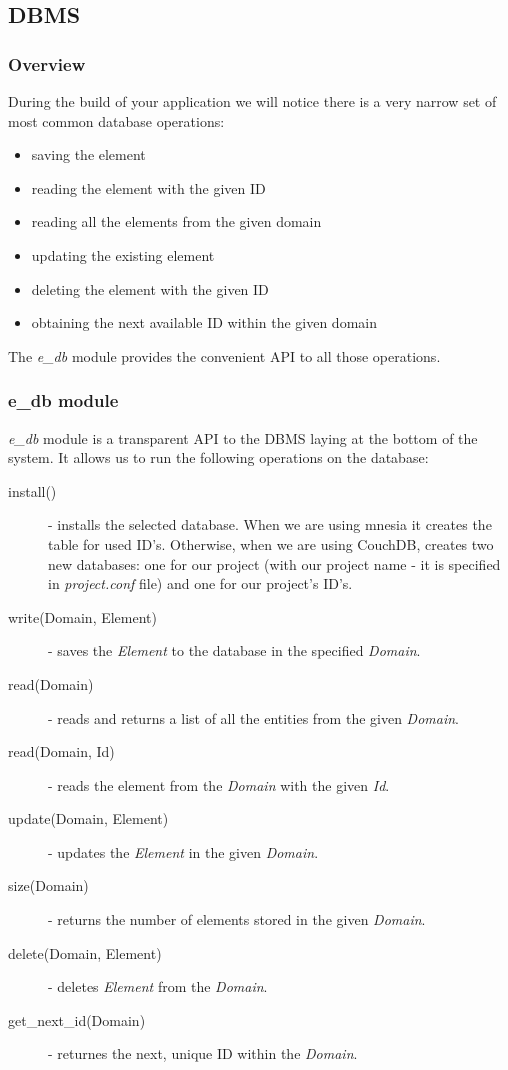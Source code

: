\subsection{DBMS}
\subsubsection{Overview}
During the build of your application we will notice there is a very narrow set of most common database operations:
\begin{itemize}
\item saving the element
\item reading the element with the given ID
\item reading all the elements from the given domain
\item updating the existing element
\item deleting the element with the given ID
\item obtaining the next available ID within the given domain
\end{itemize}

The {\it e\_db} module provides the convenient API to all those operations.

\subsubsection{e\_db module}
{\it e\_db} module is a transparent API to the DBMS laying at the bottom of the system. It allows us to run the following operations on the database:
\begin{description}
\item[install()]- installs the selected database. When we are using mnesia it creates the table for used ID's. Otherwise, when we are using CouchDB, creates two new databases: one for our project (with our project name - it is specified in {\it project.conf} file) and one for our project's ID's.
\item[write(Domain, Element)]- saves the {\it Element} to the database in the specified {\it Domain}.
\item[read(Domain)]- reads and returns a list of all the entities from the given {\it Domain}.
\item[read(Domain, Id)]- reads the element from the {\it Domain} with the given {\it Id}.
\item[update(Domain, Element)]- updates the {\it Element} in the given {\it Domain}.
\item[size(Domain)]- returns the number of elements stored in the given {\it Domain}.
\item[delete(Domain, Element)]- deletes {\it Element} from the {\it Domain}.
\item[get\_next\_id(Domain)]- returnes the next, unique ID within the {\it Domain}.
\end{description}

